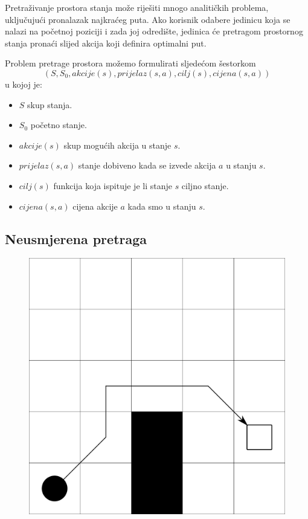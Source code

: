 \documentclass[times, utf8, zavrsni, numeric]{fer}
\begin{document}
\par Pretraživanje prostora stanja može riješiti mnogo analitičkih problema, uključujući pronalazak najkraćeg puta.
Ako korisnik odabere jedinicu koja se nalazi na početnoj poziciji i zada joj odredište, jedinica će pretragom prostornog stanja pronaći slijed akcija koji definira optimalni put.

\par Problem pretrage prostora možemo formulirati sljedećom šestorkom
\[(S, S_0, akcije(s), prijelaz(s, a), cilj(s), cijena(s, a))\]
u kojoj je:
\begin{itemize}
    \item \(S\) skup stanja.
    \item \(S_0\) početno stanje.
    \item \(akcije(s)\) skup mogućih akcija u stanje \(s\).
    \item \(prijelaz(s, a)\) stanje dobiveno kada se izvede akcija \(a\) u stanju \(s\).
    \item \(cilj(s)\) funkcija koja ispituje je li stanje \(s\) ciljno stanje.
    \item \(cijena(s, a)\) cijena akcije \(a\) kada smo u stanju \(s\). 
\end{itemize}

\subsection{Neusmjerena pretraga}

\begin{figure}[h] 
	\centering
	\includegraphics[width=0.3\linewidth]{images/basicGrid.pdf}
	\caption{}
	\label{fig:basicGrid}
\end{figure} 
\end{document}
